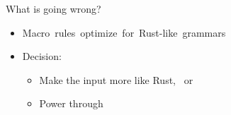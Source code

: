 \documentclass[usepdftitle=false]{beamer}
\begin{document}

\begin{frame}[fragile]{What is going wrong?}
  \begin{itemize}[label=\footnotesize{},labelsep=10pt]
  \item \mbox{Macro rules optimize for Rust-like grammars\hspace*{-1000pt}}
  \vspace{4pt}
  \item Decision:
    \begin{itemize}[label=$\circ$,labelsep=10pt]
    \vspace{-4pt}
    \item Make the input more like Rust, \ or
    \vspace{-4pt}
    \item Power through
    \end{itemize}
  \end{itemize} 
\end{frame}
\end{document}
